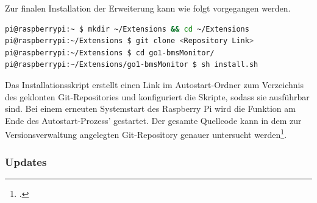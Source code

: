 

\noindent Zur finalen Installation der Erweiterung kann wie folgt vorgegangen werden.

\begin{lstlisting}[language=Bash]
pi@raspberrypi:~ $ mkdir ~/Extensions && cd ~/Extensions
pi@raspberrypi:~/Extensions $ git clone <Repository Link>
pi@raspberrypi:~/Extensions $ cd go1-bmsMonitor/
pi@raspberrypi:~/Extensions/go1-bmsMonitor $ sh install.sh
\end{lstlisting}

\noindent Das Installationsskript erstellt einen Link im Autostart-Ordner zum Verzeichnis des geklonten Git-Repositories und
konfiguriert die Skripte, sodass sie ausführbar sind.
Bei einem erneuten Systemstart des Raspberry Pi wird die Funktion am Ende des Autostart-Prozess' gestartet.
Der gesamte Quellcode kann in dem zur Versionsverwaltung angelegten Git-Repository genauer untersucht werden\footcite{git-bms-monitor}.




\subsubsection{Updates}
